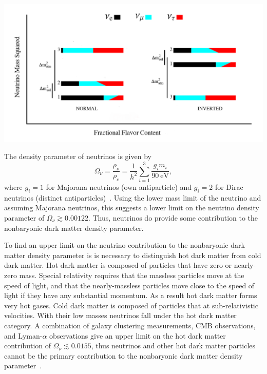 \begin{center}
\includegraphics[scale=0.4]{neutrinos.png}
\label{neutrinos}
\end{center}


The density parameter of neutrinos is given by
\[\Omega_\nu=\frac{\rho_\nu}{\rho_c}=\frac{1}{h^2}\sum_{i=1}^3 \frac{g_i m_i}{90~\text{eV}},\]
where $g_i = 1$ for Majorana neutrinos (own antiparticle) and $g_i = 2$ for Dirac neutrinos (distinct antiparticles)~\cite{Pastor}. Using the lower mass limit of the neutrino and assuming Majorana neutrinos, this suggests a lower limit on the neutrino density parameter of $\Omega_\nu \gtrsim 0.00122$.  Thus, neutrinos do provide some contribution to the nonbaryonic dark matter density parameter.  

To find an upper limit on the neutrino contribution to the nonbaryonic dark matter density parameter is is necessary to distinguish hot dark matter from cold dark matter.  Hot dark matter is composed of particles that have zero or nearly-zero mass.  Special relativity requires that the massless particles move at the speed of light, and that the nearly-massless particles move close to the speed of light if they have any substantial momentum.  As a result hot dark matter forms very hot gases.  Cold dark matter is composed of particles that at sub-relativistic velocities.  With their low masses neutrinos fall under the hot dark matter category.  A combination of galaxy clustering measurements, CMB observations, and Lyman-$\alpha$ observations give an upper limit on the hot dark matter contribution of $\Omega_\nu \lesssim 0.0155$, thus neutrinos and other hot dark matter particles cannot be the primary contribution to the nonbaryonic dark matter density parameter~\cite{Spergel}.

